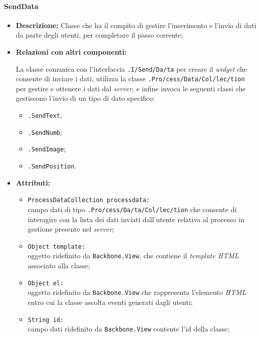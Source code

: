 \paragraph{SendData}
\label{sendData}
\begin{flushleft}
\begin{itemize}
\item \textbf{Descrizione:} Classe che ha il compito di gestire l'inserimento e l'invio di dati da parte degli utenti, per completare il passo corrente;
\item \textbf{Relazioni con altri componenti:}
\begin{sloppypar}
La classe comunica con l'interfaccia \texttt{\viewUser{}.I\fshyp{}Send\fshyp{}Da\fshyp{}ta} per creare il \textit{widget} che consente di inviare i dati, utilizza la classe \texttt{\collection{}.Pro\fshyp{}cess\fshyp{}Data\fshyp{}Col\fshyp{}lec\fshyp{}tion} per gestire e ottenere i dati dal \textit{server}, e infine invoca le seguenti classi che gestiscono l'invio di un tipo di dato specifico:
\begin{itemize}
	\item \texttt{\logicUser{}.SendText};
	\item \texttt{\logicUser{}.SendNumb};
	\item \texttt{\logicUser{}.SendImage};
	\item \texttt{\logicUser{}.SendPosition}.
\end{itemize}
\end{sloppypar}
\item \textbf{Attributi:}
\begin{sloppypar}
\begin{itemize}
\item \texttt{ProcessDataCollection processdata:}\\ campo dati di tipo \texttt{\collection{}.Pro\fshyp{}cess\fshyp{}Da\fshyp{}ta\fshyp{}Col\fshyp{}lec\fshyp{}tion} che consente di interagire con la lista dei dati inviati dall'utente relativa al processo in gestione presente nel \textit{server};
\item \texttt{Object template:}\\ oggetto ridefinito da \texttt{Backbone.View}, che contiene il \textit{template HTML} associato alla classe;
\item \texttt{Object el:}\\ oggetto ridefinito da \texttt{Backbone.View} che rappresenta l'elemento \textit{HTML} entro cui la classe ascolta eventi generati dagli utenti;
\item \texttt{String id:}\\ campo dati ridefinito da \texttt{Backbone.View} contente l'id della classe;

\end{itemize}
\end{sloppypar}
\end{itemize}
\end{flushleft}
